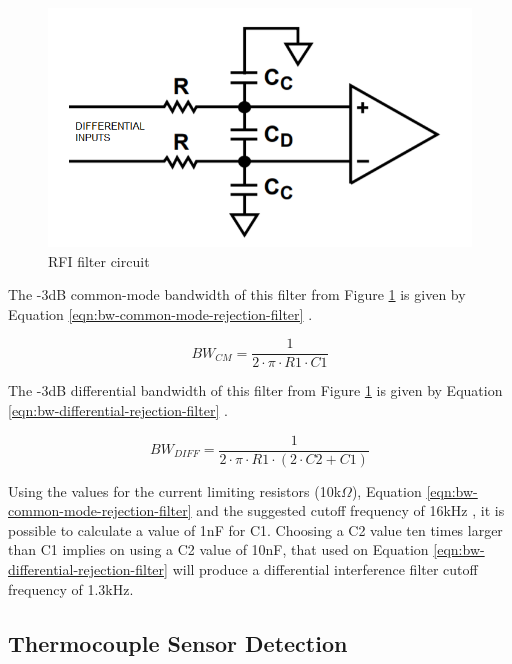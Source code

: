 		\begin{figure}[htbp]
			\centering
				\includegraphics[scale=0.65]{figuras/fig-rfi-standard-filter}
			\caption{RFI filter circuit \cite{fig-rfi-standard-filter}}
			\label{fig:rfi-standard-filter}
		\end{figure}

	The -3dB common-mode bandwidth of this filter from Figure \ref{fig:rfi-standard-filter} is given by Equation \ref{eqn:bw-common-mode-rejection-filter} \cite{analogDevDesignersGuide}.

		\begin{equation}\label{eqn:bw-common-mode-rejection-filter}
			BW_{CM}=\frac{1}{2 \cdot \pi \cdot R1 \cdot C1}
		\end{equation}
	
	The -3dB differential bandwidth of this filter from Figure \ref{fig:rfi-standard-filter} is given by Equation \ref{eqn:bw-differential-rejection-filter} \cite{analogDevDesignersGuide}.
	
		\begin{equation}\label{eqn:bw-differential-rejection-filter}
			BW_{DIFF}=\frac{1}{2 \cdot \pi \cdot R1 \cdot \left( 2 \cdot C2 + C1 \right)}
		\end{equation}
		
	Using the values for the current limiting resistors (10k$\Omega$), Equation \ref{eqn:bw-common-mode-rejection-filter} and the suggested cutoff frequency of 16kHz \cite{two-ways-thermocouple}, it is possible to calculate a value of 1nF for C1. Choosing a C2 value ten times larger than C1 implies on using a C2 value of 10nF, that used on Equation \ref{eqn:bw-differential-rejection-filter} will produce a differential interference filter cutoff frequency of 1.3kHz.
		
	\subsection{Thermocouple Sensor Detection}
		
